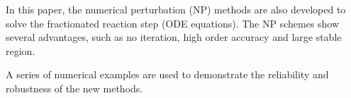 \documentclass[review]{elsarticle}
\theoremstyle{plain}\newtheorem{definition}{\sc{Definition}}
\theoremstyle{defination}\newtheorem{example}{Example}[section]
\numberwithin{equation}{section}
\numberwithin{table}{section}
\begin{document}
{In this paper, the numerical perturbation (NP) methods are also developed to solve the fractionated reaction step (ODE equations). The NP schemes show several advantages, such as no iteration, high order accuracy and large stable region.  

A series of numerical examples are used to demonstrate the reliability and robustness of the new methods.

%








}
\end{document}
